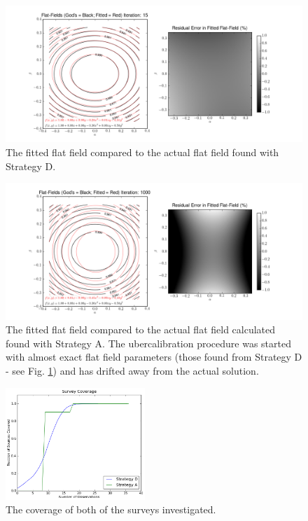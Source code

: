 \documentclass[manuscript]{aastex}
\begin{document}
\begin{figure}[ht]
\begin{center}
\includegraphics[width=\textwidth]{D_15_ff.png}
\end{center}
\caption{The fitted flat field compared to the actual flat field found with Strategy D. \label{fig:D}}
\end{figure}

\begin{figure}[ht]
\begin{center}
\includegraphics[width=\textwidth]{A_1000_ff.png}
\end{center}
\caption{The fitted flat field compared to the actual flat field calculated found with Strategy A. The ubercalibration procedure was started with almost exact flat field parameters (those found from Strategy D - see Fig. \ref{fig:D}) and has drifted away from the actual solution. \label{fig:A}}
\end{figure}

\begin{figure}[ht]
\begin{center}
\includegraphics[width=0.47\textwidth]{coverage.png}
\end{center}
\caption{The coverage of both of the surveys investigated. \label{fig:coverage}}
\end{figure}
\end{document}
